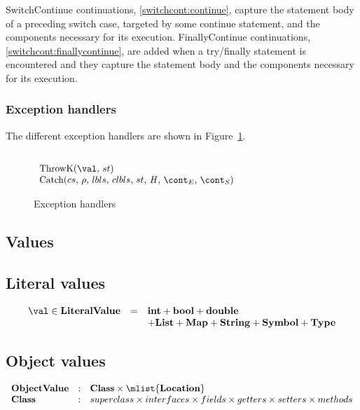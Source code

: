 \documentclass{article}
\newcounter{rowcount}[figure]
\newcounter{figurecount}
\newcommand{\myrowcount}{\refstepcounter{rowcount}\thesubsection.\thefigurecount.\therowcount}
\newcommand{\labeledrow}[1]{\myrowcount\label{#1}}
\begin{document}
SwitchContinue continuations, \ref{switchcont:continue}, capture the statement body of a preceding switch case, targeted by some continue statement, and the components necessary for its execution.
FinallyContinue continuations, \ref{switchcont:finallycontinue}, are added when a try/finally statement is encountered and they capture the statement body and the components necessary for its execution.
\subsubsection{Exception handlers}
\label{subsubsec:exception-handlers}
The different exception handlers are shown in Figure~\ref{figure:handlers}.
\newcommand{\ThrowH}[2]{\mathrm{ThrowK}({#1},\,{#2})}
\newcommand{\CatchH}[1]{\mathrm{Catch}({#1},\,\env,\,\lbls,\,\clbls,\,\strace,\,\handler,\,\econt,\,\scont)}
%
%
\begin{figure}[Htp]
  $
  \begin{array}{lll@{\hspace{5cm}}}
	&&\\
	\ThrowH{\val}{\strace}\\

	\CatchH{cs}
  \end{array}
  $
  \caption{Exception handlers}
  \label{figure:handlers}
\end{figure}

\subsection{Values}
\label{subsec:values}
\subsection{Literal values}
\label{subsubsec:literal-values}
\[
  \begin{array}{lcl}
	\val \in \dlitval &=& \mathbf{int} + \mathbf{bool} + \mathbf{double}\\
	&& + \mathbf{List} + \mathbf{Map} + \mathbf{String} + \mathbf{Symbol} + \mathbf{Type}
  \end{array}
\]
\subsection{Object values}
\label{subsec:object-values}
\[
  \begin{array}{lcl}
	\dobjval &:& \dclass \times \mlist{\dlocation}\\
	\dclass &:& superclass \times interfaces \times fields \times getters \times setters \times methods
  \end{array}
\]
\end{document}
